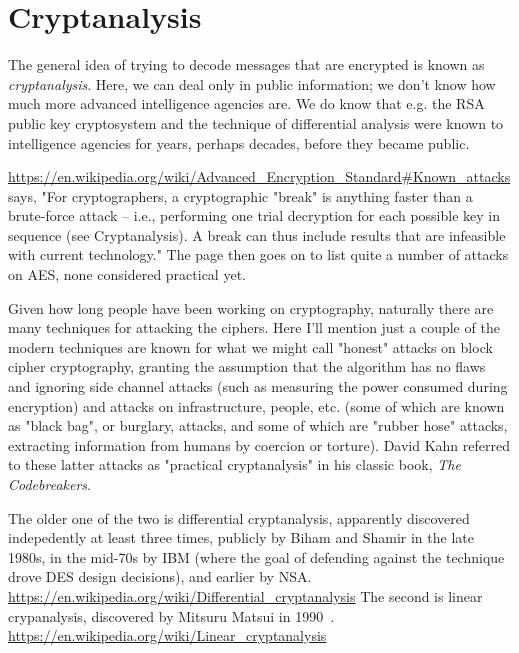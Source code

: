 \section{Cryptanalysis}
\label{sec:cryptan}


The general idea of trying to decode messages that are encrypted is
known as \emph{cryptanalysis}.  Here, we can deal only in public information;
we don't know how much more advanced intelligence agencies are.  We do
know that e.g. the RSA public key cryptosystem and the technique of
differential analysis were known to intelligence agencies for years,
perhaps decades, before they became public. 

\url{https://en.wikipedia.org/wiki/Advanced_Encryption_Standard#Known_attacks}
says, "For cryptographers, a cryptographic "break" is anything faster
than a brute-force attack – i.e., performing one trial decryption for
each possible key in sequence (see Cryptanalysis). A break can thus
include results that are infeasible with current technology."
The page then goes on to list quite a number of attacks on AES, none
considered practical yet.

Given how long people have been working on cryptography, naturally
there are many techniques for attacking the ciphers.  Here I'll
mention just a couple of the modern techniques are known for what we
might call "honest" attacks on block cipher cryptography, granting the
assumption that the algorithm has no flaws and ignoring side channel
attacks (such as measuring the power consumed during encryption) and
attacks on infrastructure, people, etc. (some of which are known as
"black bag", or burglary, attacks, and some of which are "rubber hose"
attacks, extracting information from humans by coercion or torture).
David Kahn referred to these latter attacks as "practical
cryptanalysis" in his classic book, \emph{The Codebreakers}.

The older one of the two is differential cryptanalysis, apparently
discovered indepedently at least three times, publicly by Biham and
Shamir in the late 1980s, in the mid-70s by IBM (where the goal of
defending against the technique drove DES design decisions), and
earlier by NSA.
\url{https://en.wikipedia.org/wiki/Differential_cryptanalysis}
The second is linear crypanalysis, discovered by Mitsuru Matsui in
1990~\cite{matsui1993linear}.
\url{https://en.wikipedia.org/wiki/Linear_cryptanalysis}

